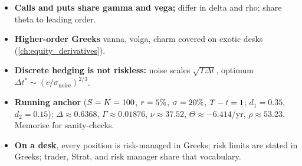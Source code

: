 \begin{itemize}
  \item \textbf{Calls and puts share gamma and vega;} differ in
  delta and rho; share theta to leading order.

  \item \textbf{Higher-order Greeks} vanna, volga, charm covered
  on exotic desks (\cref{ch:equity_derivatives}).

  \item \textbf{Discrete hedging is not riskless:} noise scales
  $\sqrt{T\Delta t}$, optimum $\Delta t^* \sim
  (c/\sigma_{\text{noise}})^{2/3}$.

  \item \textbf{Running anchor} ($S = K = 100$, $r =
  5\%$, $\sigma = 20\%$, $T - t = 1$; $d_1 = 0.35$, $d_2 =
  0.15$): $\Delta \approx 0.6368$, $\Gamma \approx 0.01876$, $\nu
  \approx 37.52$, $\Theta \approx -6.414$/yr, $\rho \approx
  53.23$. Memorise for sanity-checks.

  \item \textbf{On a desk}, every position is risk-managed in
  Greeks; risk limits are stated in Greeks; trader, Strat, and risk
  manager share that vocabulary.
\end{itemize}
